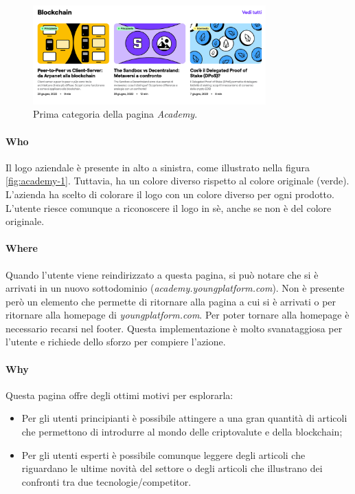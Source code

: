 \begin{figure}[H]
  \centering
  \includegraphics[width=0.80\textwidth]{res/images/internal-pages/academy/academy-2.png}
  \caption{Prima categoria della pagina \textit{Academy}.}
  \label{fig:academy-2}
\end{figure}

\paragraph{Who}

Il logo aziendale è presente in alto a sinistra, come illustrato 
nella figura \ref{fig:academy-1}. Tuttavia, ha un colore diverso rispetto 
al colore originale (verde). L'azienda ha scelto di colorare il logo con 
un colore diverso per ogni prodotto. L'utente riesce comunque a riconoscere 
il logo in sè, anche se non è del colore originale. 

\paragraph{Where}

Quando l'utente viene reindirizzato a questa pagina, si può notare che si 
è arrivati in un nuovo sottodominio (\textit{academy.youngplatform.com}). 
Non è presente però un elemento che permette di ritornare alla pagina a cui 
si è arrivati o per ritornare alla homepage di \textit{youngplatform.com}. 
Per poter tornare alla homepage è necessario recarsi nel footer. Questa 
implementazione è molto svanataggiosa per l'utente e richiede dello sforzo 
per compiere l'azione.

\paragraph{Why}

Questa pagina offre degli ottimi motivi per esplorarla:
\begin{itemize}
  \item Per gli utenti principianti è possibile attingere a una gran 
  quantità di articoli che permettono di introdurre al mondo delle 
  criptovalute e della blockchain;
  \item Per gli utenti esperti è possibile comunque leggere degli articoli 
  che riguardano le ultime novità del settore o degli articoli che 
  illustrano dei confronti tra due tecnologie/competitor.
\end{itemize}

